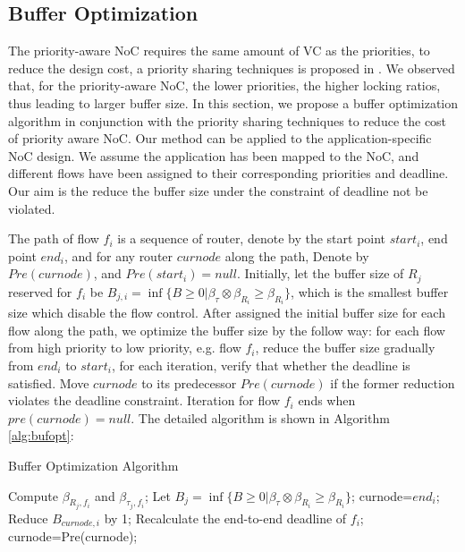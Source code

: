 \documentclass[10pt,journal]{IEEEtran}
\begin{document}
\subsection{Buffer Optimization}
The priority-aware NoC requires the same amount of VC as the priorities, to reduce the design cost, a priority sharing techniques is proposed in \cite{5161497}. We observed that, for the priority-aware NoC, the lower priorities, the higher locking ratios, thus leading to larger buffer size. In this section, we propose a buffer optimization algorithm in conjunction with the priority sharing techniques to reduce the cost of priority aware NoC. Our method can be applied to the application-specific NoC design. We assume the application has been mapped to the NoC, and different flows have been assigned to their corresponding priorities and deadline. Our aim is the reduce the buffer size under the constraint of deadline not be violated.

The path of flow $f_i$ is a sequence of router, denote by the start point $start_i$, end point $end_i$, and for any router $curnode$ along the path, Denote by $Pre(curnode)$, and $Pre(start_i)=null$. Initially, let the buffer size of $R_j$ reserved for $f_i$ be $B_{j,i}=\inf\{B\geq 0|\beta_{\tau}\otimes\beta_{R_i}\geq \beta_{R_i}\}$, which is the smallest buffer size which disable the flow control. After assigned the initial buffer size for each flow along the path, we optimize the buffer size by the follow way: for each flow from high priority to low priority, e.g. flow $f_i$, reduce the buffer size gradually from $end_i$ to $start_i$, for each iteration, verify that whether the deadline is satisfied. Move $curnode$ to its predecessor $Pre(curnode)$ if the former reduction violates the deadline constraint. Iteration for flow $f_i$ ends when $pre(curnode)=null$. The detailed algorithm is shown in Algorithm \ref{alg:bufopt}:
\begin{algorithm}
\caption{Buffer Optimization Algorithm}
\label{alg:bufopt}
\begin{algorithmic}[1]
        \STATE Compute $\beta_{R_j,f_i}$ and $\beta_{\tau_j,f_i}$;
        \STATE Let $B_j=\inf\{B\geq 0|\beta_{\tau}\otimes\beta_{R_i}\geq \beta_{R_i}\}$;
    \ENDFOR
        \STATE curnode=$end_i$;
                \STATE Reduce $B_{curnode,i}$ by 1;
                \STATE Recalculate the end-to-end deadline of $f_i$;
            \ENDWHILE
            curnode=Pre(curnode);
        \ENDWHILE
    \ENDFOR
\end{algorithmic}
\end{algorithm}
\end{document}
